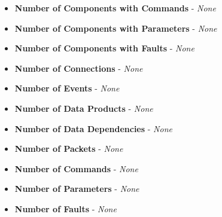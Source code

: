 \begin{itemize}
  \item \textbf{Number of Components with Commands} - 
    \textit{None}

  \item \textbf{Number of Components with Parameters} - 
    \textit{None}

  \item \textbf{Number of Components with Faults} - 
    \textit{None}

  \item \textbf{Number of Connections} - 
    \textit{None}

  \item \textbf{Number of Events} - 
    \textit{None}

  \item \textbf{Number of Data Products} - 
    \textit{None}

  \item \textbf{Number of Data Dependencies} -
    \textit{None}

  \item \textbf{Number of Packets} - 
    \textit{None}
    
  \item \textbf{Number of Commands} - 
    \textit{None}

  \item \textbf{Number of Parameters} - 
    \textit{None}

  \item \textbf{Number of Faults} - 
    \textit{None}

\end{itemize}
